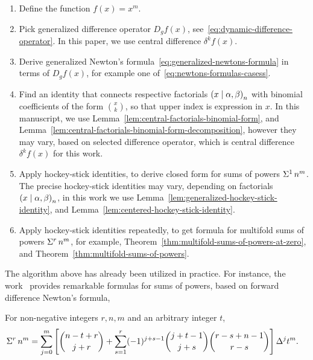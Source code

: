 \begin{algorithm} 
  \label{alg:sums-of-powers}
  \leavevmode\par
  \begin{enumerate}
    \item Define the function $f(x) = x^m$.
    \item Pick generalized difference operator $D_g f(x)$, see~\eqref{eq:dynamic-difference-operator}.
      In this paper, we use central difference $\delta^k f(x)$.
    \item Derive generalized Newton's formula~\eqref{eq:generalized-newtons-formula}
      in terms of $D_g f(x)$, for example one of~\eqref{eq:newtons-formulas-casess}.
    \item Find an identity that connects respective factorials $\left(x\mid \alpha, \beta\right)_{n}$
      with binomial coefficients of the form $\binom{x}{k}$,
      so that upper index is expression in $x$. In this manuscript, we use Lemma~\eqref{lem:central-factorials-binomial-form},
      and Lemma~\eqref{lem:central-factorials-binomial-form-decomposition},
      however they may vary, based on selected difference operator,
      which is central difference $\delta^k f(x)$ for this work.
    \item Apply hockey-stick identities, to derive closed form for sums of powers $\Sigma^{1}\,{n}^{m}$.
      The precise hockey-stick identities may vary, depending on factorials $\left(x\mid \alpha, \beta\right)_{n}$,
      in this work we use Lemma~\eqref{lem:generalized-hockey-stick-identity},
      and
      Lemma~\eqref{lem:centered-hockey-stick-identity}.
    \item Apply hockey-stick identities repeatedly, to get formula for multifold sums of powers $\Sigma^{r}\,{n}^{m}$,
      for example, Theorem~\eqref{thm:multifold-sums-of-powers-at-zero}, and Theorem~\eqref{thm:multifold-sums-of-powers}.
  \end{enumerate}
\end{algorithm}
The algorithm above has already been utilized in practice.
For instance, the work~\cite{kolosov_2026_forward} provides remarkable
formulas for sums of powers, based on forward difference Newton's formula,
\begin{proposition}
  For non-negative integers $r,n,m$ and an arbitrary integer $t$,
  \begin{align*}
    \Sigma^{r}\,{n}^{m}
    &= \sum_{j=0}^{m}
    \left[ \binom{n-t+r}{j+r} +
      \sum_{s=1}^{r} (-1)^{j+s-1} \binom{j+t-1}{j+s} \binom{r-s+n-1}{r-s}
    \right] \Delta^{j} t^{m}.
  \end{align*}
\end{proposition}
